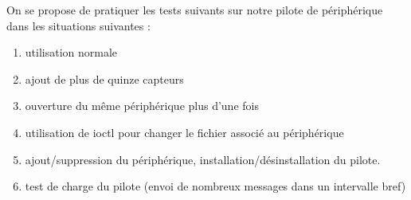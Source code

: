On se propose de pratiquer les tests suivants sur notre pilote de périphérique dans les situations suivantes :

\begin{enumerate}
 \item utilisation normale
 \item ajout de plus de quinze capteurs
 \item ouverture du même périphérique plus d'une fois
 \item utilisation de ioctl pour changer le fichier associé au périphérique
 \item ajout/suppression du périphérique, installation/désinstallation du pilote.
 \item test de charge du pilote (envoi de nombreux messages dans un intervalle bref)
\end{enumerate}
